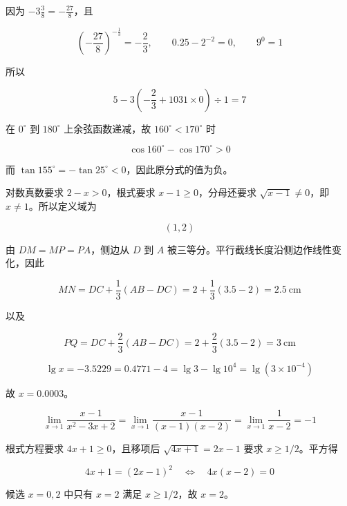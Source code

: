 \begin{answer}

因为 $-3\frac38=-\frac{27}{8}$，且

\nopagebreak[4]
\[
\left(-\frac{27}{8}\right)^{-\frac13}=-\frac23,
\qquad
0.25-2^{-2}=0,
\qquad
9^0=1
\]

所以

\nopagebreak[4]
\[
5-3\left(-\frac23+1031\times0\right)\div1=7
\]


在 $0^\circ$ 到 $180^\circ$ 上余弦函数递减，故 $160^\circ<170^\circ$ 时

\nopagebreak[4]
\[
\cos160^\circ-\cos170^\circ>0
\]

而 $\tan155^\circ=-\tan25^\circ<0$，因此原分式的值为负。


对数真数要求 $2-x>0$，根式要求 $x-1\ge0$，分母还要求 $\sqrt{x-1}\ne0$，即 $x\ne1$。所以定义域为

\nopagebreak[4]
\[
(1,2)
\]


由 $DM=MP=PA$，侧边从 $D$ 到 $A$ 被三等分。平行截线长度沿侧边作线性变化，因此

\nopagebreak[4]
\[
MN=DC+\frac13(AB-DC)=2+\frac13(3.5-2)=2.5\ \mathrm{cm}
\]

以及

\nopagebreak[4]
\[
PQ=DC+\frac23(AB-DC)=2+\frac23(3.5-2)=3\ \mathrm{cm}
\]


\nopagebreak[4]
\[
\lg x=-3.5229=0.4771-4=\lg3-\lg10^4=\lg(3\times10^{-4})
\]

故 $x=0.0003$。


\nopagebreak[4]
\[
\lim_{x\to1}\frac{x-1}{x^2-3x+2}
=\lim_{x\to1}\frac{x-1}{(x-1)(x-2)}
=\lim_{x\to1}\frac1{x-2}=-1
\]


根式方程要求 $4x+1\ge0$，且移项后 $\sqrt{4x+1}=2x-1$ 要求 $x\ge1/2$。平方得

\nopagebreak[4]
\[
4x+1=(2x-1)^2
\quad\Longleftrightarrow\quad
4x(x-2)=0
\]

候选 $x=0,2$ 中只有 $x=2$ 满足 $x\ge1/2$，故 $x=2$。



\end{answer}
